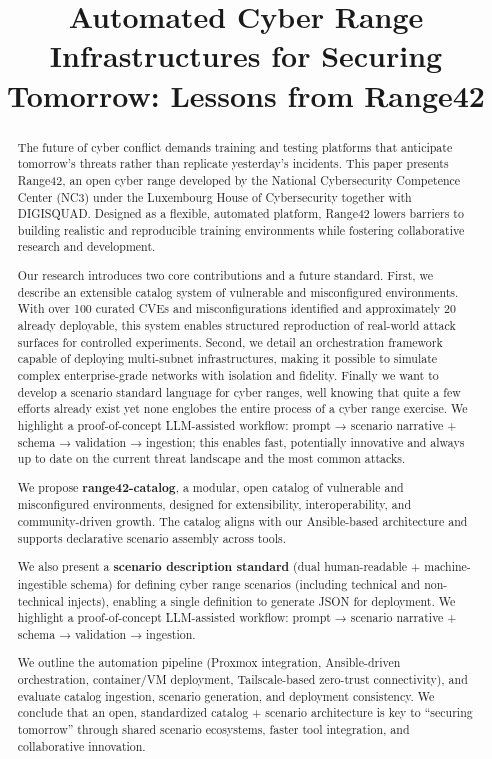 \documentclass[11pt]{article}
\title{Automated Cyber Range Infrastructures for Securing Tomorrow: Lessons from Range42}
\author{} %
\date{}   %
\begin{document}
\maketitle

\begin{abstract}
The future of cyber conflict demands training and testing platforms that anticipate tomorrow’s threats rather than replicate yesterday’s incidents. This paper presents Range42, an open cyber range developed by the National Cybersecurity Competence Center (NC3) under the Luxembourg House of Cybersecurity together with DIGISQUAD. Designed as a flexible, automated platform, Range42 lowers barriers to building realistic and reproducible training environments while fostering collaborative research and development.

Our research introduces two core contributions and a future standard. First, we describe an extensible catalog system of vulnerable and misconfigured environments. With over 100 curated CVEs and misconfigurations identified and approximately 20 already deployable, this system enables structured reproduction of real-world attack surfaces for controlled experiments. Second, we detail an orchestration framework capable of deploying multi-subnet infrastructures, making it possible to simulate complex enterprise-grade networks with isolation and fidelity. Finally we want to develop a scenario standard language for cyber ranges, well knowing that quite a few efforts already exist yet none englobes the entire process of a cyber range exercise. We highlight a proof-of-concept LLM-assisted workflow: prompt → scenario narrative + schema → validation → ingestion; this enables fast, potentially innovative and always up to date on the current threat landscape and the most common attacks.

We propose \textbf{range42-catalog}, a modular, open catalog of vulnerable and misconfigured environments, designed for extensibility, interoperability, and community-driven growth. The catalog aligns with our Ansible-based architecture and supports declarative scenario assembly across tools.

We also present a \textbf{scenario description standard} (dual human-readable + machine-ingestible schema) for defining cyber range scenarios (including technical and non-technical injects), enabling a single definition to generate JSON for deployment. We highlight a proof-of-concept LLM-assisted workflow: prompt → scenario narrative + schema → validation → ingestion.

We outline the automation pipeline (Proxmox integration, Ansible-driven orchestration, container/VM deployment, Tailscale-based zero-trust connectivity), and evaluate catalog ingestion, scenario generation, and deployment consistency. We conclude that an open, standardized catalog + scenario architecture is key to “securing tomorrow” through shared scenario ecosystems, faster tool integration, and collaborative innovation.
\end{abstract}
\end{document}
